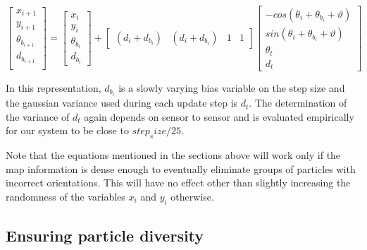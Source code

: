\begin{equation}
\begin{bmatrix}x_{i+1}\\
y_{i+1}\\
\theta_{b_{i+1}}\\
d_{b_{i+1}}\\
\end{bmatrix} = \begin{bmatrix}x_{i}\\
y_{i}\\
\theta_{b_i}\\
d_{b_i}
\end{bmatrix}  + \begin{bmatrix}(d{}_{i}+d_{b_i}) & (d{}_{i}+d_{b_i}) & 1 & 1\end{bmatrix} \begin{bmatrix}-cos(\theta_{i}+\theta_{b_i}+\vartheta)\\
sin(\theta_{i}+\theta_{b_i}+\vartheta)\\
\theta_t\\
d_{t}
\end{bmatrix} 
\end{equation}

In this representation, $d_{b_i}$ is a slowly varying bias variable on the step
size and the gaussian variance used during each update step is $d_t$. The 
determination of the variance of $d_t$ again depends on sensor to sensor and 
is evaluated empirically for our system to be close to $step_size/25$.

Note that the equations mentioned in the sections above will work only if 
the map information is dense enough to eventually eliminate groups of particles
with incorrect orientations. This will have no effect other than slightly
increasing the randomness of the variables $x_i$ and $y_i$ otherwise.

\subsection{Ensuring particle diversity}

